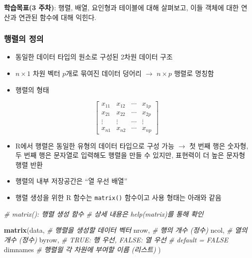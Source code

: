 \documentclass[
  11pt,
]{krantz}
\makeatletter
\newenvironment{Shaded}{\begin{snugshade}}{\end{snugshade}}
\newcommand{\CommentTok}[1]{\textcolor[rgb]{0.37,0.37,0.37}{\textit{#1}}}
\newcommand{\KeywordTok}[1]{\textcolor[rgb]{0.27,0.27,0.27}{\textbf{#1}}}
\newcommand{\NormalTok}[1]{#1}
\providecommand{\tightlist}{%
  \setlength{\itemsep}{0pt}\setlength{\parskip}{0pt}}
\newenvironment{kframe}{%
\medskip{}
\setlength{\fboxsep}{.8em}
 \def\at@end@of@kframe{}%
 \ifinner\ifhmode%
  \def\at@end@of@kframe{\end{minipage}}%
  \begin{minipage}{\columnwidth}%
 \fi\fi%
 \def\FrameCommand##1{\hskip\@totalleftmargin \hskip-\fboxsep
 \colorbox{shadecolor}{##1}\hskip-\fboxsep
     \hskip-\linewidth \hskip-\@totalleftmargin \hskip\columnwidth}%
 \MakeFramed {\advance\hsize-\width
   \@totalleftmargin\z@ \linewidth\hsize
   \@setminipage}}%
 {\par\unskip\endMakeFramed%
 \at@end@of@kframe}
\newenvironment{rmdblock}[1]
  {
  \begin{itemize}
  \renewcommand{\labelitemi}{
    \raisebox{-.7\height}[0pt][0pt]{
      {\setkeys{Gin}{width=3em,keepaspectratio}\texttt{[image: images/\#1]}}
    }
  }
  \setlength{\fboxsep}{1em}
  \begin{kframe}
  \item
  }
  {
  \end{kframe}
  \end{itemize}
  }
\newenvironment{rmdnote}
  {\begin{rmdblock}{note}}
  {\end{rmdblock}}
\makeatother
\begin{document}
\footnotesize

\begin{rmdnote}
\begin{rmdnote}

\textbf{학습목표(3 주차)}: 행렬, 배열, 요인형과 테이블에 대해 살펴보고, 이들 객체에 대한 연산과 연관된 함수에 대해 익힌다.

\end{rmdnote}
\end{rmdnote}

\normalsize

\hypertarget{def-matrix}{%
\subsubsection*{\texorpdfstring{\textbf{행렬의 정의}}{행렬의 정의}}\label{def-matrix}}


\begin{itemize}
\tightlist
\item
  동일한 데이터 타입의 원소로 구성된 2차원 데이터 구조
\item
  \(n \times 1\) 차원 벡터 \(p\)개로 묶여진 데이터 덩어리 \(\rightarrow\) \(n \times p\) 행렬로 명칭함
\item
  행렬의 형태
\end{itemize}

\[\begin{bmatrix}
x_{11} & x_{12} & \cdots & x_{1p} \\
x_{21} & x_{22} & \cdots & x_{2p} \\
\vdots & \vdots & \cdots & \vdots \\
x_{n1} & x_{n2} & \cdots & x_{np}
\end{bmatrix}
\]

\begin{itemize}
\tightlist
\item
  R에서 행렬은 동일한 유형의 데이터 타입으로 구성 가능 \(\rightarrow\) 첫 번째 행은 숫자형, 두 번째 행은 문자열로 입력해도 행렬을 만들 수 있지만, 표현력이 더 높은 문자형 행렬 반환
\item
  행렬의 내부 저장공간은 ``열 우선 배열''
\item
  행렬 생성을 위한 R 함수는 \texttt{matrix()} 함수이고 사용 형태는 아래와 같음
\end{itemize}

\footnotesize

\begin{Shaded}
\begin{Highlighting}[]
\CommentTok{# matrix(): 행렬 생성 함수}
\CommentTok{# 상세 내용은 help(matrix)를 통해 확인}

\KeywordTok{matrix}\NormalTok{(data, }\CommentTok{# 행렬을 생성할 데이터 벡터 }
\NormalTok{       nrow, }\CommentTok{# 행의 개수 (정수)}
\NormalTok{       ncol, }\CommentTok{# 열의 개수 (정수)}
\NormalTok{       byrow, }\CommentTok{# TRUE: 행 우선, FALSE: 열 우선}
              \CommentTok{# default = FALSE}
\NormalTok{       dimnames }\CommentTok{# 행렬읠 각 차원에 부여할 이름 (리스트)}
\NormalTok{       )}
\end{Highlighting}
\end{Shaded}
\end{document}
